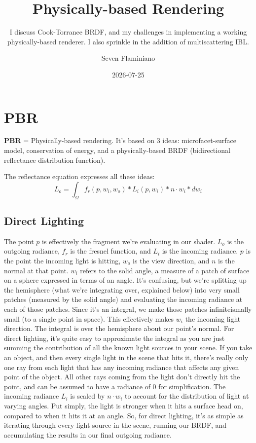 \documentclass{article}
\title{Physically-based Rendering}
\subtitle{I discuss Cook-Torrance BRDF, and my challenges in implementing a working physically-based renderer. I also sprinkle in the addition of multiscattering IBL.}
\author{Seven Flaminiano}
\date{2026-07-25}
\begin{document}
\maketitle
\tableofcontents{}

\section{PBR}
\textbf{PBR} = Physically-based rendering. It's based on 3 ideas: microfacet-surface model, conservation of energy, and a physically-based BRDF (bidirectional reflectance distribution function).

The reflectance equation expresses all these ideas:
\[L_o = \int_{\Omega} f_r(p, w_i, w_o) * L_i(p, w_i) * n \cdot w_i * dw_i\]

\subsection{Direct Lighting}

The point \(p\) is effectively the fragment we're evaluating in our shader. 
\(L_o\) is the outgoing radiance, \(f_r\) is the fresnel function, and \(L_i\) is the incoming radiance.
\(p\) is the point the incoming light is hitting, \(w_o\) is the view direction, and \(n\) is the normal at that point.
\(w_i\) refers to the solid angle, a measure of a patch of surface on a sphere expressed in terms of an angle.
It's confusing, but we're splitting up the hemisphere (what we're integrating over, explained below) into very small patches (measured by the solid angle)
and evaluating the incoming radiance at each of those patches. Since it's an integral, we make those patches infiniteismally small (to a single point in space). This effectively makes
\(w_i\) the incoming light direction. The integral is over the hemisphere about our point's normal. For direct lighting,
it's quite easy to approximate the integral as you are just summing the contribution of all the known light sources in your scene. If you take an object, and then every single light in the scene that 
hits it, there's really only one ray from each light that has any incoming radiance that affects any given point of the object. All other rays coming from the light don't directly hit
the point, and can be assumed to have a radiance of \(0\) for simplification. The incoming radiance \(L_i\) is scaled by \(n \cdot w_i\) to account for the distribution of light at varying angles. 
Put simply, the light is stronger when it hits a surface head on, compared to when it hits it at an angle. So, for direct lighting, 
it's as simple as iterating through every light source in the scene, running our BRDF, and accumulating the results in our final outgoing radiance.
\end{document}
